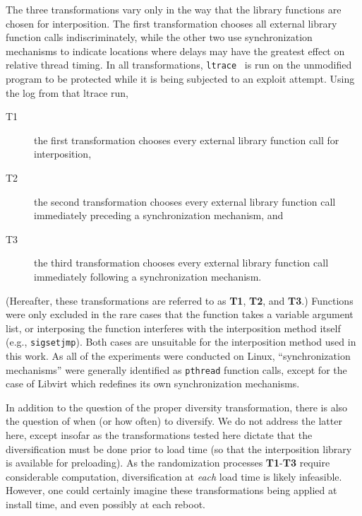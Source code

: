 The three transformations vary only in the way that the library functions are chosen for interposition.
The first transformation chooses all external library function calls indiscriminately, while the other two use synchronization mechanisms to indicate locations where delays may have the greatest effect on relative thread timing.
In all transformations, \texttt{ltrace}~\cite{cespedesltrace} is run on the unmodified program to be protected while it is being subjected to an exploit attempt.
Using the log from that ltrace run,
\begin{description}
	\item[T1] the first transformation chooses every external library function call for interposition,
	\item[T2] the second transformation chooses every external library function call immediately preceding a synchronization mechanism, and
	\item[T3] the third transformation chooses every external library function call immediately following a synchronization mechanism.
\end{description}
(Hereafter, these transformations are referred to as \textbf{T1}, \textbf{T2}, and \textbf{T3}.)
Functions were only excluded in the rare cases that the function takes a
variable argument list, or interposing the function interferes with the
interposition method itself (e.g., \texttt{sigsetjmp}).
Both cases are unsuitable for the interposition method used in this work.
As all of the experiments were conducted on Linux, ``synchronization
mechanisms'' were generally identified as \texttt{pthread} function calls, except for the case of Libvirt which redefines its own synchronization mechanisms.

In addition to the question of the proper diversity transformation, there is also the question of when (or how often) to diversify.
We do not address the latter here, except insofar as the transformations tested here dictate that the diversification must be done prior to load time (so that the interposition library is available for preloading).
As the randomization processes \textbf{T1}-\textbf{T3} require considerable computation, diversification at \textit{each} load time is likely infeasible.
However, one could certainly imagine these transformations being applied at install time, and even possibly at each reboot.